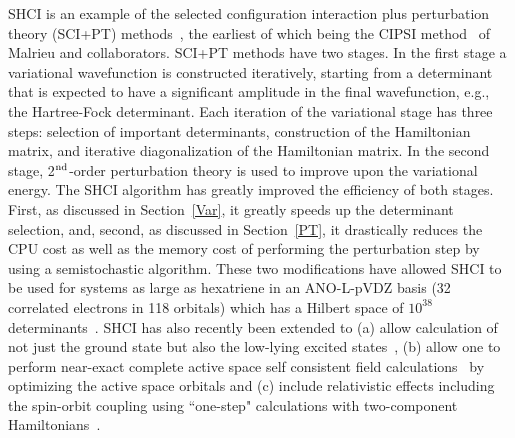 \documentclass[%
preprint,
 superscriptaddress,
 amsmath,amssymb,
 aps,
]{revtex4-1}
\begin{document}
SHCI is an example of the selected configuration interaction plus perturbation theory (SCI+PT)
methods~\cite{HurMalRan-JCP-73,BuePey-TCA-74,EvaDauMal-CP-83,CimPer-JCoP-87,Har-JCP-91,Wul-CPL-96,BytRue-CP-09,Eva-JCP-14,SceAppGinCaf-JCoC-16,GarSceLooCaf-JCP-17,LooSceBloGarCafJac-JCP-18,TubLevHaiHeaWha-ARX-18},
the earliest of which being
the CIPSI method~\cite{HurMalRan-JCP-73,EvaDauMal-CP-83} of Malrieu and collaborators.
SCI+PT methods have two stages.  In the first stage a variational wavefunction is constructed iteratively, starting from
a determinant that is expected to have a significant amplitude in the final wavefunction, e.g., the Hartree-Fock determinant.
Each iteration of the variational stage has three steps: selection of important determinants, construction of the Hamiltonian matrix, and
iterative diagonalization of the Hamiltonian matrix.
In the second stage, 2$^{\rm nd}$-order perturbation theory is used to improve upon the variational energy.
The SHCI algorithm has greatly improved the efficiency of both stages.
First, as discussed in Section~\ref{Var}, it greatly speeds up the determinant selection, and, second, as discussed in
Section~\ref{PT}, it drastically reduces the CPU cost as well as the memory cost of performing the perturbation step by using a semistochastic algorithm.
These two modifications have allowed SHCI to be used for systems as large as hexatriene
in an ANO-L-pVDZ basis (32 correlated electrons in 118 orbitals) which has a Hilbert space of $10^{38}$ determinants~\cite{ChiHolOttUmrShaZim-JPCA-18}.
SHCI has also recently been extended to (a) allow calculation of not just the ground state but also the low-lying excited states~\cite{HolUmrSha-JCP-17}, 
(b) allow one to perform near-exact complete active space self consistent field calculations~\cite{SmiMusHolSha-JCTC-17} by optimizing the active space orbitals and (c) include relativistic effects including the spin-orbit coupling using ``one-step" calculations with two-component Hamiltonians~\cite{MusSha-JCTC-17}.
\end{document}
